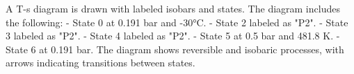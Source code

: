 A T-s diagram is drawn with labeled isobars and states. The diagram includes the following:  
- State 0 at 0.191 bar and -30°C.  
- State 2 labeled as "P2".  
- State 3 labeled as "P2".  
- State 4 labeled as "P2".  
- State 5 at 0.5 bar and 481.8 K.  
- State 6 at 0.191 bar.  
The diagram shows reversible and isobaric processes, with arrows indicating transitions between states.